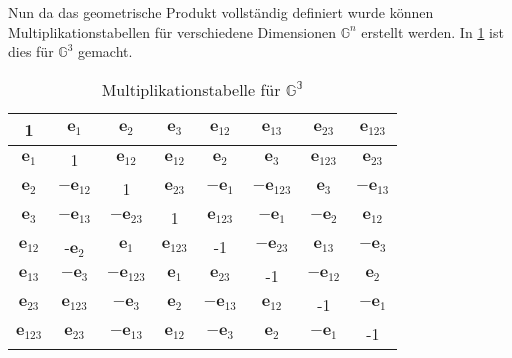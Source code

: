 Nun da das geometrische Produkt vollständig definiert wurde können Multiplikationstabellen für verschiedene Dimensionen $\mathbb{G}^n$ erstellt werden. In \ref{tab:multip} ist dies für  $\mathbb{G}^3$ gemacht.
\begin{table}
    \caption{Multiplikationstabelle für $\mathbb{G^3}$}
    \label{tab:multip}
    \begin{center}
    \begin{tabular}{ |c|c|c|c|c|c|c|c| } 
     \hline
     1 & $\textbf{e}_1$ & $\textbf{e}_2$ &$\textbf{e}_3$ & $\textbf{e}_{12}$ & $\textbf{e}_{13}$ & $\textbf{e}_{23}$ & $\textbf{e}_{123}$\\
     \hline
     $\textbf{e}_1$ & 1 & $\textbf{e}_{12}$ & $\textbf{e}_{12}$ & $\textbf{e}_2$ & $\textbf{e}_3$ & $\textbf{e}_{123}$ & $\textbf{e}_{23}$\\
     \hline
     $\textbf{e}_2$ & $-\textbf{e}_{12}$ & 1 & $\textbf{e}_{23}$ & $-\textbf{e}_1$ & $-\textbf{e}_{123}$ & $\textbf{e}_3$ & $-\textbf{e}_{13}$\\
     \hline
     $\textbf{e}_3$ & $-\textbf{e}_{13}$ & $-\textbf{e}_{23}$ & 1 & $\textbf{e}_{123}$ & $-\textbf{e}_1$ & $-\textbf{e}_2$ & $\textbf{e}_{12}$\\
     \hline
     $\textbf{e}_{12}$ & -$\textbf{e}_2$ & $\textbf{e}_1$& $\textbf{e}_{123}$ & -1 & $-\textbf{e}_{23}$ & $\textbf{e}_{13}$ &  $-\textbf{e}_{3}$\\
     \hline
     $\textbf{e}_{13}$ & $-\textbf{e}_{3}$ & $-\textbf{e}_{123}$ & $\textbf{e}_{1}$ & $\textbf{e}_{23}$ & -1 & $-\textbf{e}_{12}$ &  $\textbf{e}_{2}$\\
     \hline
     $\textbf{e}_{23}$ &  $\textbf{e}_{123}$ & $-\textbf{e}_{3}$ & $\textbf{e}_{2}$ & $-\textbf{e}_{13}$ & $\textbf{e}_{12}$ & -1 & $-\textbf{e}_{1}$ \\
     \hline
     $\textbf{e}_{123}$ & $\textbf{e}_{23}$ & $-\textbf{e}_{13}$ & $\textbf{e}_{12}$ & $-\textbf{e}_{3}$& $\textbf{e}_{2}$ & $-\textbf{e}_{1}$ & -1 \\
     \hline
    \end{tabular}
    \end{center}
\end{table}
